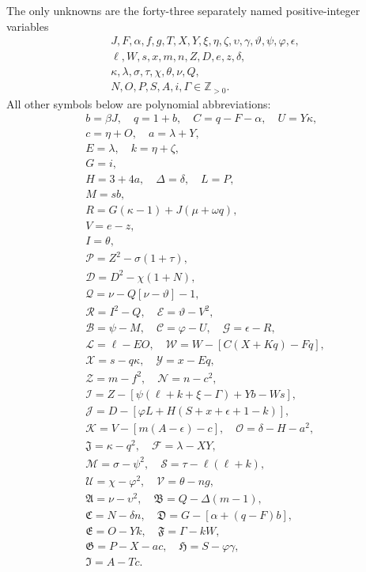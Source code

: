 The only unknowns are the forty-three separately named positive-integer variables
\[
\begin{gathered}J,F,\alpha,f,g,T,X,Y,\xi,\eta,\zeta,\upsilon,\gamma,\vartheta,\psi,\varphi,\epsilon,\\
\ell,W,s,x,m,n,Z,D,e,z,\delta,\\
\kappa,\lambda,\sigma,\tau,\chi,\theta,\nu,Q,\\
N,O,P,S,A,i,\Gamma\in\mathbb Z_{>0}.\end{gathered}
\]
All other symbols below are polynomial abbreviations:
\[
\begin{gathered}
b=\beta J,\quad q=1+b,\quad C=q-F-\alpha,\quad U=Y\kappa,\\
c=\eta+O,\quad a=\lambda+Y,\\
E=\lambda,\quad k=\eta+\zeta,\\
G=i,\\
H=3+4a,\quad\Delta=\delta,\quad L=P,\\
M=sb,\\
R=G(\kappa-1)+J(\mu+\omega q),\\
V=e-z,\\
I=\theta,\\
\mathcal{P}=Z^2-\sigma(1+\tau),\\
\mathcal{D}=D^2-\chi(1+N),\\
\mathcal{Q}=\nu-Q[\nu-\vartheta]-1,\\
\mathcal{R}=I^2-Q,\quad \mathcal{E}=\vartheta-V^2,\\
\mathcal{B}=\psi-M,\quad \mathcal{C}=\varphi-U,\quad \mathcal{G}=\epsilon-R,\\
\mathcal{L}=\ell-EO,\quad \mathcal{W}=W-[C(X+Kq)-Fq],\\
\mathcal{X}=s-q\kappa,\quad \mathcal{Y}=x-Eq,\\
\mathcal{Z}=m-f^2,\quad \mathcal{N}=n-c^2,\\
\mathcal{I}=Z-[\psi(\ell+k+\xi-\Gamma)+Yb-Ws],\\
\mathcal{J}=D-[\varphi L+H(S+x+\epsilon+1-k)],\\
\mathcal{K}=V-[m(A-\epsilon)-c],\quad\mathcal{O}=\delta-H-a^2,\\
\mathfrak{J}=\kappa-q^2,\quad\mathcal{F}=\lambda-XY,\\
\mathcal{M}=\sigma-\psi^2,\quad\mathcal{S}=\tau-\ell(\ell+k),\\
\mathcal{U}=\chi-\varphi^2,\quad\mathcal{V}=\theta-ng,\\
\mathfrak{A}=\nu-\upsilon^2,\quad\mathfrak{B}=Q-\Delta(m-1),\\
\mathfrak{C}=N-\delta n,\quad\mathfrak{D}=G-[\alpha+(q-F)b],\\
\mathfrak{E}=O-Yk,\quad\mathfrak{F}=\Gamma-kW,\\
\mathfrak{G}=P-X-ac,\quad\mathfrak{H}=S-\varphi\gamma,\\
\mathfrak{I}=A-Tc.
\end{gathered}
\]
